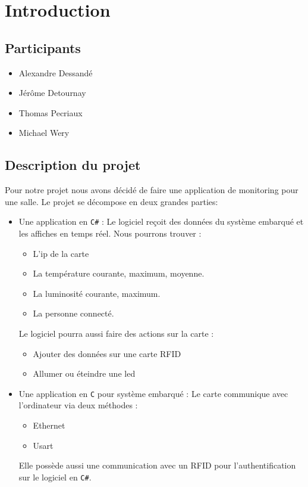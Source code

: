 \documentclass[12pt,a4paper]{report}
\begin{document}
\chapter{Introduction}
	\section{Participants}
		\begin{itemize}
		\item Alexandre Dessandé
		\item Jérôme Detournay
		\item Thomas Pecriaux
		\item Michael Wery
		\end{itemize}
	
	\section{Description du projet}
			Pour notre projet nous avons décidé de faire une application de monitoring pour 
		une salle. Le projet se décompose en deux grandes parties:
		\renewcommand {\labelitemii }{$\diamond $}		
		\begin{itemize}
		\item Une application en \verb+C#+ : 
		Le logiciel reçoit des données du système embarqué et les affiches en temps réel. Nous pourrons
		trouver :
			\begin{itemize}
			\item L'ip de la carte
			\item La température courante, maximum, moyenne.
			\item La luminosité courante, maximum.
			\item La personne connecté.
			\end{itemize}
		Le logiciel pourra aussi faire des actions sur la carte :
			\begin{itemize}
			\item Ajouter des données sur une carte RFID
			\item Allumer ou éteindre une led
			\end{itemize}
		\item Une application en \verb+C+ pour système embarqué :
		Le carte communique avec l'ordinateur via deux méthodes :
			\begin{itemize}
			\item Ethernet
			\item Usart
			\end{itemize}
		Elle possède aussi une communication avec un RFID pour l'authentification sur le logiciel en \verb+C#+.
		\end{itemize}
\end{document}
